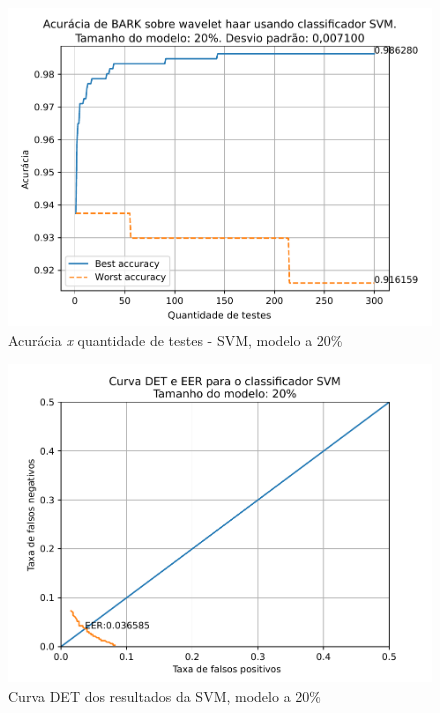 			\begin{figure}[H]
				\centering
				\includegraphics[width=.9\linewidth]{images/results/confusionMatrices/classifier_SVM_20}
				\caption{Acurácia \textit{x} quantidade de testes - SVM, modelo a 20\%}
				\label{fig:classifiersvm20}
			\end{figure}
		
			\begin{figure}[H]
				\centering
				\includegraphics[width=.9\linewidth]{images/results/det/DET_for_classifier_SVM_20}
				\caption{Curva DET dos resultados da SVM, modelo a 20\%}
				\label{fig:detsvm20}
			\end{figure}


